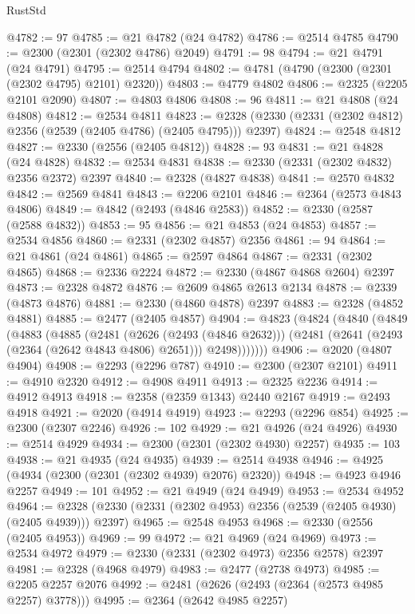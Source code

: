 \begin{lexlean}{RustStd}
\begin{coremodule}
@4782 := 97
@4785 := @21 @4782 (@24 @4782)
@4786 := @2514 @4785
@4790 := @2300 (@2301 (@2302 @4786) @2049)
@4791 := 98
@4794 := @21 @4791 (@24 @4791)
@4795 := @2514 @4794
@4802 := @4781 (@4790 (@2300 (@2301 (@2302 @4795) @2101) @2320))
@4803 := @4779 @4802
@4806 := @2325 (@2205 @2101 @2090)
@4807 := @4803 @4806
@4808 := 96
@4811 := @21 @4808 (@24 @4808)
@4812 := @2534 @4811
@4823 := @2328 (@2330 (@2331 (@2302 @4812) @2356 (@2539 (@2405 @4786) (@2405 @4795))) @2397)
@4824 := @2548 @4812
@4827 := @2330 (@2556 (@2405 @4812))
@4828 := 93
@4831 := @21 @4828 (@24 @4828)
@4832 := @2534 @4831
@4838 := @2330 (@2331 (@2302 @4832) @2356 @2372) @2397
@4840 := @2328 (@4827 @4838)
@4841 := @2570 @4832
@4842 := @2569 @4841
@4843 := @2206 @2101
@4846 := @2364 (@2573 @4843 @4806)
@4849 := @4842 (@2493 (@4846 @2583))
@4852 := @2330 (@2587 (@2588 @4832))
@4853 := 95
@4856 := @21 @4853 (@24 @4853)
@4857 := @2534 @4856
@4860 := @2331 (@2302 @4857) @2356
@4861 := 94
@4864 := @21 @4861 (@24 @4861)
@4865 := @2597 @4864
@4867 := @2331 (@2302 @4865)
@4868 := @2336 @2224
@4872 := @2330 (@4867 @4868 @2604) @2397
@4873 := @2328 @4872
@4876 := @2609 @4865 @2613 @2134
@4878 := @2339 (@4873 @4876)
@4881 := @2330 (@4860 @4878) @2397
@4883 := @2328 (@4852 @4881)
@4885 := @2477 (@2405 @4857)
@4904 := @4823
    (@4824
      (@4840
        (@4849
          (@4883
            (@4885
              (@2481
                (@2626 (@2493 (@4846 @2632)))
                (@2481 (@2641 (@2493 (@2364 (@2642 @4843 @4806) @2651))) @2498)))))))
@4906 := @2020 (@4807 @4904)
@4908 := @2293 (@2296 @787)
@4910 := @2300 (@2307 @2101)
@4911 := @4910 @2320
@4912 := @4908 @4911
@4913 := @2325 @2236
@4914 := @4912 @4913
@4918 := @2358 (@2359 @1343) @2440 @2167
@4919 := @2493 @4918
@4921 := @2020 (@4914 @4919)
@4923 := @2293 (@2296 @854)
@4925 := @2300 (@2307 @2246)
@4926 := 102
@4929 := @21 @4926 (@24 @4926)
@4930 := @2514 @4929
@4934 := @2300 (@2301 (@2302 @4930) @2257)
@4935 := 103
@4938 := @21 @4935 (@24 @4935)
@4939 := @2514 @4938
@4946 := @4925 (@4934 (@2300 (@2301 (@2302 @4939) @2076) @2320))
@4948 := @4923 @4946 @2257
@4949 := 101
@4952 := @21 @4949 (@24 @4949)
@4953 := @2534 @4952
@4964 := @2328 (@2330 (@2331 (@2302 @4953) @2356 (@2539 (@2405 @4930) (@2405 @4939))) @2397)
@4965 := @2548 @4953
@4968 := @2330 (@2556 (@2405 @4953))
@4969 := 99
@4972 := @21 @4969 (@24 @4969)
@4973 := @2534 @4972
@4979 := @2330 (@2331 (@2302 @4973) @2356 @2578) @2397
@4981 := @2328 (@4968 @4979)
@4983 := @2477 (@2738 @4973)
@4985 := @2205 @2257 @2076
@4992 := @2481 (@2626 (@2493 (@2364 (@2573 @4985 @2257) @3778)))
@4995 := @2364 (@2642 @4985 @2257)

\end{coremodule}
\end{lexlean}
